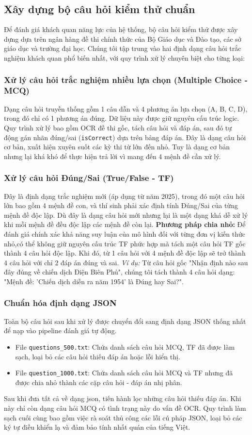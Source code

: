 \subsection{Xây dựng bộ câu hỏi kiểm thử chuẩn}
Để đánh giá khách quan năng lực của hệ thống, bộ câu hỏi kiểm thử được xây dựng dựa trên ngân hàng đề thi chính thức của Bộ Giáo dục và Đào tạo, các sở giáo dục và trường đại học. Chúng tôi tập trung vào hai định dạng câu hỏi trắc nghiệm khách quan phổ biến nhất, với quy trình xử lý chuyên biệt cho từng loại:
\subsubsection{Xử lý câu hỏi trắc nghiệm nhiều lựa chọn (Multiple Choice - MCQ)}
Dạng câu hỏi truyền thống gồm 1 câu dẫn và 4 phương án lựa chọn (A, B, C, D), trong đó chỉ có 1 phương án đúng. Dữ liệu này được giữ nguyên cấu trúc logic. Quy trình xử lý bao gồm OCR đề thi gốc, tách câu hỏi và đáp án, sau đó tự động gán nhãn đúng/sai (\texttt{isCorrect}) dựa trên bảng đáp án. Đây là dạng câu hỏi cơ bản, xuất hiện xuyên suốt các kỳ thi từ lớn đến nhỏ. Tuy là dạng cơ bản nhưng lại khá khó để thực hiện trả lời vì mang đến 4 mệnh đề cần xử lý.
\subsubsection{Xử lý câu hỏi Đúng/Sai (True/False - TF)}
Đây là định dạng trắc nghiệm mới (áp dụng từ năm 2025), trong đó một câu hỏi lớn bao gồm 4 mệnh đề con, và thí sinh phải xác định tính Đúng/Sai của từng mệnh đề độc lập. Dù đây là dạng câu hỏi mới nhưng lại là một dạng khá dễ xử lý khi mỗi mệnh đề đều độc lập các mệnh đề còn lại.
\textbf{Phương pháp chia nhỏ:}
Để đánh giá chính xác khả năng suy luận của mô hình đối với từng đơn vị kiến thức nhỏ,có thể không giữ nguyên cấu trúc TF phức hợp mà tách một câu hỏi TF gốc thành 4 câu hỏi độc lập. Khi đó, từ 1 câu hỏi với 4 mệnh đề độc lập sẽ trở thành 4 câu hỏi với chỉ 2 đáp án đúng và sai.
\textit{Ví dụ:} Từ câu hỏi gốc "Nhận định nào sau đây đúng về chiến dịch Điện Biên Phủ", chúng tôi tách thành 4 câu hỏi dạng: "Mệnh đề: 'Chiến dịch diễn ra năm 1954' là Đúng hay Sai?".
\subsubsection{Chuẩn hóa định dạng JSON}
Toàn bộ câu hỏi sau khi xử lý được chuyển đổi sang định dạng JSON thống nhất để nạp vào pipeline đánh giá tự động.
\begin{itemize}
    \item File \texttt{questions\_500.txt}: Chứa danh sách câu hỏi MCQ, TF đã được làm sạch, loại bỏ các câu hỏi thiếu đáp án hoặc lỗi hiển thị.
    \item File \texttt{question\_1000.txt}: Chứa danh sách câu hỏi MCQ và TF nhưng đã được chia nhỏ thành các cặp câu hỏi - đáp án nhị phân.
\end{itemize}
Sau khi đưa tất cả về dạng json, tiến hành lọc những câu hỏi thiếu đáp án. Khi này chỉ còn dạng câu hỏi MCQ có tình trạng này do vấn đề OCR. Quy trình làm sạch cuối cùng bao gồm việc rà soát thủ công các lỗi cú pháp JSON, loại bỏ các ký tự điều khiển lạ và đảm bảo tính nhất quán của tiếng Việt.